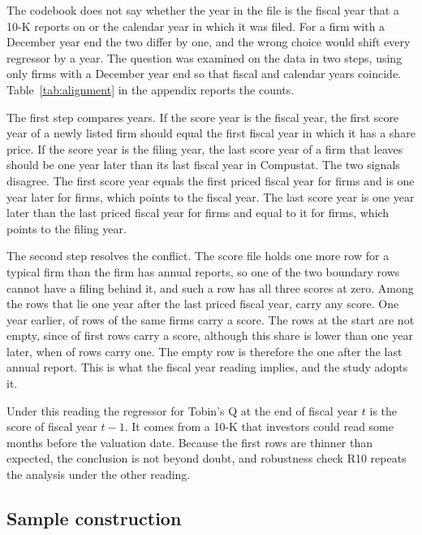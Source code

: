 \documentclass[12pt,a4paper]{article}
\begin{document}
The codebook does not say whether the year in the file is the fiscal year that a 10-K reports on or the calendar year in which it was filed. For a firm with a December year end the two differ by one, and the wrong choice would shift every regressor by a year. The question was examined on the data in two steps, using only firms with a December year end so that fiscal and calendar years coincide. Table~\ref{tab:alignment} in the appendix reports the counts.

The first step compares years. If the score year is the fiscal year, the first score year of a newly listed firm should equal the first fiscal year in which it has a share price. If the score year is the filing year, the last score year of a firm that leaves should be one year later than its last fiscal year in Compustat. The two signals disagree. The first score year equals the first priced fiscal year for \entryZero{} firms and is one year later for \entryOne{} firms, which points to the fiscal year. The last score year is one year later than the last priced fiscal year for \exitOne{} firms and equal to it for \exitZero{} firms, which points to the filing year.

The second step resolves the conflict. The score file holds one more row for a typical firm than the firm has annual reports, so one of the two boundary rows cannot have a filing behind it, and such a row has all three scores at zero. Among the \nTrailRows{} rows that lie one year after the last priced fiscal year, \nTrailFilled{} carry any score. One year earlier, \nTrailBeforeFilled{} of \nTrailBefore{} rows of the same firms carry a score. The rows at the start are not empty, since \nFirstFilled{} of \nFirstRows{} first rows carry a score, although this share is lower than one year later, when \nFirstNextFilled{} of \nFirstNext{} rows carry one. The empty row is therefore the one after the last annual report. This is what the fiscal year reading implies, and the study adopts it.

Under this reading the regressor for Tobin's Q at the end of fiscal year $t$ is the score of fiscal year $t-1$. It comes from a 10-K that investors could read some months before the valuation date. Because the first rows are thinner than expected, the conclusion is not beyond doubt, and robustness check R10 repeats the analysis under the other reading.

\subsection{Sample construction}
\end{document}
